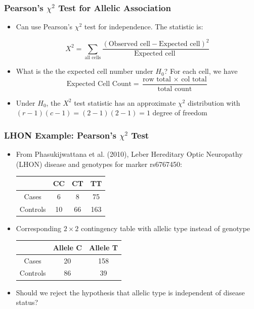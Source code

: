 \documentclass{beamer}
\begin{document}
\begin{frame}
\frametitle{\bf Pearson's $\chi^2$ Test for Allelic Association}
\begin{itemize}
\item Can use Pearson's $\chi^2$ test for independence. The statistic is:

  \[ X^2 = \sum_{\mbox{all cells}} \frac{\left(\mbox{Observed cell} - \mbox{
        Expected cell}\right)^2}{\mbox{Expected cell }} \]
\item What is the the expected cell number under $H_0$? For each cell, we have
  \[ \mbox{Expected Cell Count} = \frac{\mbox{row total } \times
    \mbox{ col total}}{\mbox{total count}} \]
\item Under $H_0$, the $X^2$ test statistic has an approximate $\chi^2$
  distribution with $(r-1)(c-1)=(2-1)(2-1)=1$ degree of freedom
\end{itemize}
\end{frame}


\begin{frame}
\frametitle{\bf LHON Example: Pearson's $\chi^2$ Test }
\begin{itemize}
\item From Phasukijwattana et al. (2010), Leber Hereditary Optic Neuropathy (LHON) disease and genotypes for marker rs6767450:\\

    \begin{center}
      \begin{tabular}{|c|ccc|}
        \hline
         & CC & CT & TT\\
 \hline
  Cases & 6 & 8 &75 \\
  Controls& 10&66& 163\\
 \hline
      \end{tabular}
    \end{center}


\item Corresponding $2 \times 2$ contingency table with allelic type instead of genotype
    \begin{center}
      \begin{tabular}{|c|cc|}
        \hline
         & Allele C  &  Allele T\\
 \hline
  Cases & 20 & 158  \\
  Controls &86& 39 \\
 \hline
      \end{tabular}
    \end{center}
\item Should we reject the hypothesis that allelic type is independent of disease status?
\end{itemize}
\end{frame}
\end{document}
